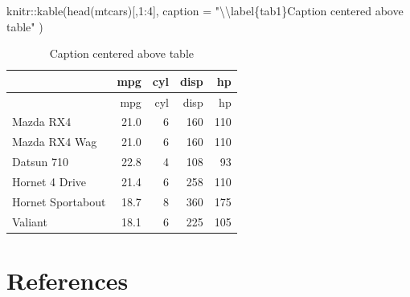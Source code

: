 \documentclass[preprint, 3p,
authoryear]{elsarticle} %
\newenvironment{Shaded}{\begin{snugshade}}{\end{snugshade}}
\newcommand{\AttributeTok}[1]{\textcolor[rgb]{0.77,0.63,0.00}{#1}}
\newcommand{\DecValTok}[1]{\textcolor[rgb]{0.00,0.00,0.81}{#1}}
\newcommand{\FunctionTok}[1]{\textcolor[rgb]{0.00,0.00,0.00}{#1}}
\newcommand{\NormalTok}[1]{#1}
\newcommand{\SpecialCharTok}[1]{\textcolor[rgb]{0.00,0.00,0.00}{#1}}
\newcommand{\StringTok}[1]{\textcolor[rgb]{0.31,0.60,0.02}{#1}}
\begin{document}
\begin{Shaded}
\begin{Highlighting}[]
\NormalTok{knitr}\SpecialCharTok{::}\FunctionTok{kable}\NormalTok{(}\FunctionTok{head}\NormalTok{(mtcars)[,}\DecValTok{1}\SpecialCharTok{:}\DecValTok{4}\NormalTok{], }
    \AttributeTok{caption =} \StringTok{"}\SpecialCharTok{\textbackslash{}\textbackslash{}}\StringTok{label\{tab1\}Caption centered above table"}
\NormalTok{)}
\end{Highlighting}
\end{Shaded}

\begin{longtable}[]{@{}lrrrr@{}}
\caption{\label{tab1}Caption centered above table}\tabularnewline
\toprule()
& mpg & cyl & disp & hp \\
\midrule()
\endfirsthead
\toprule()
& mpg & cyl & disp & hp \\
\midrule()
\endhead
Mazda RX4 & 21.0 & 6 & 160 & 110 \\
Mazda RX4 Wag & 21.0 & 6 & 160 & 110 \\
Datsun 710 & 22.8 & 4 & 108 & 93 \\
Hornet 4 Drive & 21.4 & 6 & 258 & 110 \\
Hornet Sportabout & 18.7 & 8 & 360 & 175 \\
Valiant & 18.1 & 6 & 225 & 105 \\
\bottomrule()
\end{longtable}

\newpage

\hypertarget{references}{%
\section*{References}\label{references}}
\end{document}

